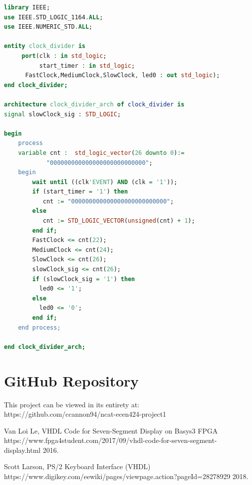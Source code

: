 \documentclass[11pt]{article}
\begin{document}
\begin{appendices}
\begin{lstlisting}[language=VHDL]
library IEEE;
use IEEE.STD_LOGIC_1164.ALL;
use IEEE.NUMERIC_STD.ALL;

entity clock_divider is
     port(clk : in std_logic;
          start_timer : in std_logic;
	  FastClock,MediumClock,SlowClock, led0 : out std_logic);
end clock_divider;

architecture clock_divider_arch of clock_divider is
signal slowClock_sig : STD_LOGIC;

begin
    process
    variable cnt :	std_logic_vector(26 downto 0):= 
    		"000000000000000000000000000";
    begin
        wait until ((clk'EVENT) AND (clk = '1'));
		if (start_timer = '1') then
	       cnt := "000000000000000000000000000";
	    else
           cnt := STD_LOGIC_VECTOR(unsigned(cnt) + 1);
	    end if;
   	    FastClock <= cnt(22);
   	    MediumClock <= cnt(24);
   	    SlowClock <= cnt(26);
        slowClock_sig <= cnt(26);
        if (slowClock_sig = '1') then
		  led0 <= '1';
	    else
		  led0 <= '0';
	    end if;
	end process;

end clock_divider_arch;

\end{lstlisting}

\section{GitHub Repository}

This project can be viewed in its entirety at: https://github.com/ccannon94/ncat-ecen424-project1

\end{appendices}

\begin{thebibliography}{9}

  Van Loi Le,
  VHDL Code for Seven-Segment Display on Basys3 FPGA
  https://www.fpga4student.com/2017/09/vhdl-code-for-seven-segment-display.html
  2016.
  
  Scott Larson,
  PS/2 Keyboard Interface (VHDL)
  https://www.digikey.com/eewiki/pages/viewpage.action?pageId=28278929
  2018.
   \end{thebibliography} 
\end{document}
